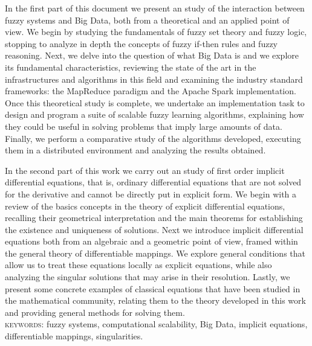 %
%
%

In the first part of this document we present an study of the interaction between fuzzy systems and Big Data, both from a theoretical and an applied point of view. We begin by studying the fundamentals of fuzzy set theory and fuzzy logic, stopping to analyze in depth the concepts of fuzzy if-then rules and fuzzy reasoning. Next, we delve into the question of what Big Data is and we explore its fundamental characteristics, reviewing the state of the art in the infrastructures and algorithms in this field and examining the industry standard frameworks: the MapReduce paradigm and the Apache Spark implementation. Once this theoretical study is complete, we undertake an implementation task to design and program a suite of scalable fuzzy learning algorithms, explaining how they could be useful in solving problems that imply large amounts of data. Finally, we perform a comparative study of the algorithms developed, executing them in a distributed environment and analyzing the results obtained.

In the second part of this work we carry out an study of first order implicit differential equations, that is, ordinary differential equations that are not solved for the derivative and cannot be directly put in explicit form. We begin with a review of the basics concepts in the theory of explicit differential equations, recalling their geometrical interpretation and the main theorems for establishing the existence and uniqueness of solutions. Next we introduce implicit differential equations both from an algebraic and a geometric point of view, framed within the general theory of differentiable mappings. We explore general conditions that allow us to treat these equations locally as explicit equations, while also analyzing the singular solutions that may arise in their resolution. Lastly, we present some concrete examples of classical equations that have been studied in the mathematical community, relating them to the theory developed in this work and providing general methods for solving them.\\


\noindent\textsc{keywords:} fuzzy systems, computational scalability, Big Data, implicit equations, differentiable mappings, singularities.
